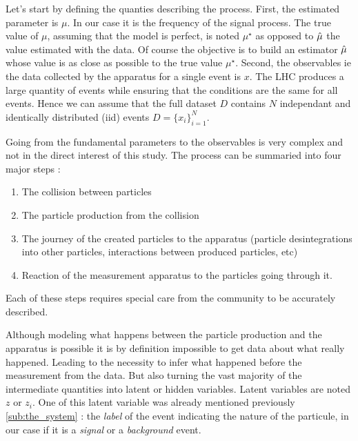 Let's start by defining the quanties describing the process.
First, the estimated parameter is $\mu$.
In our case it is the frequency of the signal process.
The true value of $\mu$, assuming that the model is perfect, is noted $\mu^\star$ as opposed to $\hat\mu$ the value estimated with the data.
Of course the objective is to build an estimator $\hat\mu$ whose value is as close as possible to the true value $\mu^\star$.
Second, the observables ie the data collected by the apparatus for a single event is $x$.
The LHC produces a large quantity of events while ensuring that the conditions are the same for all events.
Hence we can assume that the full dataset $D$ contains $N$ independant and identically distributed (iid) events $D = \{x_i\}_{i=1}^N$.

Going from the fundamental parameters to the observables is very complex and not in the direct interest of this study.
The process can be summaried into four major steps :
\begin{enumerate}
	\item The collision between particles
	\item The particle production from the collision
	\item The journey of the created particles to the apparatus (particle desintegrations into other particles, interactions between produced particles, etc)
	\item Reaction of the measurement apparatus to the particles going through it.
\end{enumerate}

Each of these steps requires special care from the community to be accurately described.

Although modeling what happens between the particle production and the apparatus is possible it is by definition impossible to get data about what really happened.
Leading to the necessity to infer what happened before the measurement from the data.
But also turning the vast majority of the intermediate quantities into latent or hidden variables.
Latent variables are noted $z$ or $z_i$.
One of this latent variable was already mentioned previously \autoref{sub:the_system} : the \emph{label} of the event indicating the nature of the particule, in our case if it is a \emph{signal} or a \emph{background} event.


